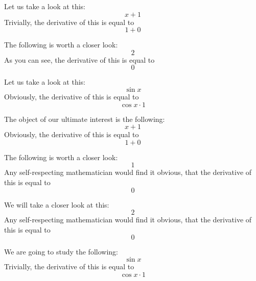 \documentclass{article}
\begin{document}
Let us take a look at this:
\begin{equation}
x + 1 
\end{equation}
Trivially, the derivative of this is equal to
\begin{equation}
1 + 0 
\end{equation}

The following is worth a closer look:
\begin{equation}
2 
\end{equation}
As you can see, the derivative of this is equal to
\begin{equation}
0 
\end{equation}

Let us take a look at this:
\begin{equation}
\sin x 
\end{equation}
Obviously, the derivative of this is equal to
\begin{equation}
\cos x \cdot 1 
\end{equation}

The object of our ultimate interest is the following:
\begin{equation}
x + 1 
\end{equation}
Obviously, the derivative of this is equal to
\begin{equation}
1 + 0 
\end{equation}

The following is worth a closer look:
\begin{equation}
1 
\end{equation}
Any self-respecting mathematician would find it obvious, that the derivative of this is equal to
\begin{equation}
0 
\end{equation}

We will take a closer look at this:
\begin{equation}
2 
\end{equation}
Any self-respecting mathematician would find it obvious, that the derivative of this is equal to
\begin{equation}
0 
\end{equation}

We are going to study the following:
\begin{equation}
\sin x 
\end{equation}
Trivially, the derivative of this is equal to
\begin{equation}
\cos x \cdot 1 
\end{equation}
\end{document}
